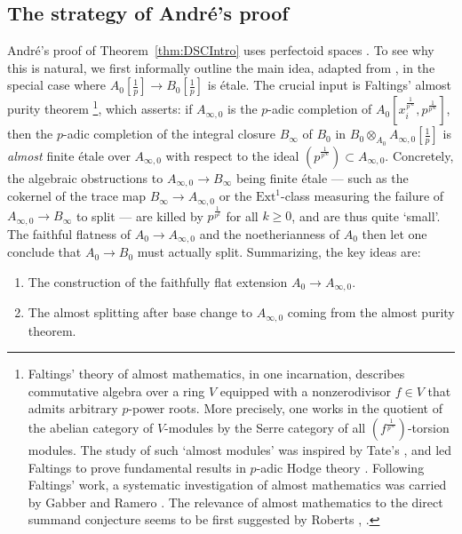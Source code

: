 \documentclass[10pt,reqno]{amsart}
\begin{document}
\subsection{The strategy of Andr\'e's proof}


Andr\'e's proof of Theorem~\ref{thm:DSCIntro} uses perfectoid spaces \cite{ScholzePerfectoidSpaces}. To see why this is natural, we first informally outline the main idea, adapted from \cite{BhattAlmostDSC}, in the special case where $A_0[\frac{1}{p}]  \to B_0[\frac{1}{p}]$ is \'etale. The crucial input is Faltings' almost purity theorem \cite{FaltingsAEE}\footnote{Faltings' theory of almost mathematics, in one incarnation, describes commutative algebra over a ring $V$ equipped with a nonzerodivisor  $f \in V$ that admits arbitrary $p$-power roots. More precisely, one works in the quotient of the abelian category of $V$-modules by the Serre category of all $(f^{\frac{1}{p^\infty}})$-torsion modules. The study of such `almost modules' was inspired by Tate's \cite{TatepDivGrp}, and led Faltings to prove fundamental results in $p$-adic Hodge theory \cite{FaltingspHT,FaltingsCrysCoh,FaltingsVeryRamified,FaltingsAEE}. Following Faltings' work, a systematic investigation of almost mathematics was carried by Gabber and Ramero \cite{GabberRamero,GabberRameroFART}. The relevance of almost mathematics to the direct summand conjecture seems to be first suggested by Roberts \cite{RobertsRootClosure}, \cite[\S 0]{GabberRamero}.}, which asserts: if $A_{\infty,0}$ is the $p$-adic completion of $A_0[x_i^{\frac{1}{p^\infty}}, p^{\frac{1}{p^\infty}}]$, then the $p$-adic completion of the integral closure $B_\infty$ of $B_0$ in $B_0 \otimes_{A_0} A_{\infty,0}[\frac{1}{p}]$ is {\em almost} finite \'etale over $A_{\infty,0}$ with respect to the ideal $(p^{\frac{1}{p^\infty}}) \subset A_{\infty,0}$. Concretely, the algebraic obstructions to $A_{\infty,0} \to B_\infty$ being finite \'etale --- such as the cokernel of the trace map $B_\infty \to A_{\infty,0}$ or the $\mathrm{Ext}^1$-class measuring the failure of $A_{\infty,0} \to B_\infty$ to split --- are killed by $p^{\frac{1}{p^k}}$ for all $k \geq 0$, and are thus quite `small'. The faithful flatness of $A_0 \to A_{\infty,0}$ and the noetherianness of $A_0$ then let one conclude that $A_0 \to B_0$ must actually split. Summarizing, the key ideas are: 
\begin{enumerate}
\item The construction of the faithfully flat extension $A_0 \to A_{\infty,0}$.
\item The almost splitting after base change to $A_{\infty,0}$ coming from the almost purity theorem.
\end{enumerate}
\end{document}
